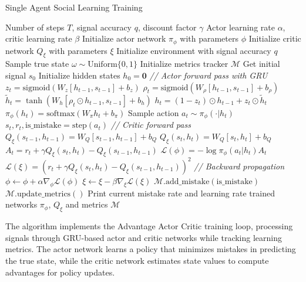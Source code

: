 \begin{algorithm}[H]
\caption{Single Agent Social Learning Training}
\label{alg:single-agent-training}
    \begin{algorithmic}[1]
    \Require Number of steps $T$, signal accuracy $q$, discount factor $\gamma$
    \Require Actor learning rate $\alpha$, critic learning rate $\beta$
    \State Initialize actor network $\pi_{\phi}$ with parameters $\phi$
    \State Initialize critic network $Q_{\xi}$ with parameters $\xi$
    \State Initialize environment with signal accuracy $q$
    \State Sample true state $\omega \sim \text{Uniform}\{0,1\}$
    \State Initialize metrics tracker $\mathcal{M}$
    \State Get initial signal $s_0$
    \State Initialize hidden states $h_0 = \mathbf{0}$
        \State \textit{// Actor forward pass with GRU}
        \State $z_t = \text{sigmoid}(W_z[h_{t-1}, s_{t-1}] + b_z)$
        \State $\rho_t = \text{sigmoid}(W_\rho[h_{t-1}, s_{t-1}] + b_\rho)$
        \State $\tilde{h}_t = \tanh(W_h[\rho_t \odot h_{t-1}, s_{t-1}] + b_h)$
        \State $h_t = (1-z_t) \odot h_{t-1} + z_t \odot \tilde{h}_t$
        \State $\pi_{\phi}(h_t) = \text{softmax}(W_{\pi}h_t + b_{\pi})$
        \State Sample action $a_t \sim \pi_{\phi}(\cdot|h_t)$
        \State $s_t, r_t, \text{is\_mistake} = \text{step}(a_t)$ 
        \State \textit{// Critic forward pass}
        \State $Q_{\xi}(s_{t-1}, h_{t-1}) = W_Q[s_{t-1}, h_{t-1}] + b_Q$
        \State $Q_{\xi}(s_t, h_t) = W_Q[s_t, h_t] + b_Q$
        \State $A_t = r_t + \gamma Q_{\xi}(s_t, h_t) - Q_{\xi}(s_{t-1}, h_{t-1})$
        \State $\mathcal{L}(\phi) = -\log \pi_{\phi}(a_t|h_t) A_t$ 
        \State $\mathcal{L}(\xi) = (r_t + \gamma Q_{\xi}(s_t, h_t) - Q_{\xi}(s_{t-1}, h_{t-1}))^2$ 
        \State \textit{// Backward propagation}
        \State $\phi \leftarrow \phi + \alpha \nabla_{\phi} \mathcal{L}(\phi)$ 
        \State $\xi \leftarrow \xi - \beta \nabla_{\xi} \mathcal{L}(\xi)$ 
        \State $\mathcal{M}.\text{add\_mistake}(\text{is\_mistake})$
        \State $\mathcal{M}.\text{update\_metrics}()$
            \State Print current mistake rate and learning rate
        \EndIf
    \EndFor
    \State \Return trained networks $\pi_{\phi}$, $Q_{\xi}$ and metrics $\mathcal{M}$
    \end{algorithmic}
\end{algorithm}

The algorithm implements the Advantage Actor Critic training loop, processing signals through GRU-based actor and critic networks while tracking learning metrics. The actor network learns a policy that minimizes mistakes in predicting the true state, while the critic network estimates state values to compute advantages for policy updates.


